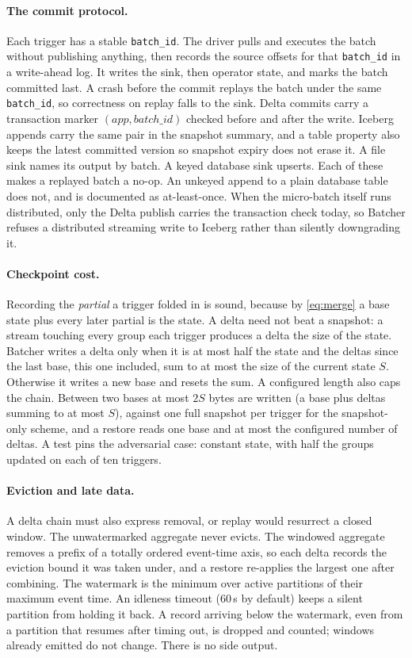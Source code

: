 \documentclass[10pt,twocolumn,letterpaper]{article}   %
\newcommand{\sys}{Batcher}
\begin{document}
\paragraph{The commit protocol.} Each trigger has a stable \texttt{batch\_id}. The driver
pulls and executes the batch without publishing anything, then records the source offsets for
that \texttt{batch\_id} in a write-ahead log. It writes the sink, then operator state, and
marks the batch committed last. A crash before the commit replays the batch under the same
\texttt{batch\_id}, so correctness on replay falls to the sink. Delta commits carry a
transaction marker $(\mathit{app},\mathit{batch\_id})$ checked before and after the write. Iceberg appends carry
the same pair in the snapshot summary, and a table property also keeps the latest committed
version so snapshot expiry does not erase it. A file sink names its output by batch. A keyed
database sink upserts. Each of these makes a replayed batch a no-op. An unkeyed append to a
plain database table does not, and is documented as at-least-once. When the micro-batch itself
runs distributed, only the Delta publish carries the transaction check today, so \sys{}
refuses a distributed streaming write to Iceberg rather than silently downgrading it.

\paragraph{Checkpoint cost.} Recording the \emph{partial} a trigger folded in is sound,
because by \cref{eq:merge} a base state plus every later partial is the state. A delta need
not beat a snapshot: a stream touching every group each trigger produces a delta the size of
the state. \sys{} writes a delta only when it is at most half the state and the deltas since the
last base, this one included, sum to at most the size of the current state $S$. Otherwise it writes a new base and resets the
sum. A configured length also caps the chain. Between two bases at most $2S$ bytes are written
(a base plus deltas summing to at most $S$), against one full snapshot per trigger for the
snapshot-only scheme, and a restore reads one base and at most the configured number of
deltas. A test pins the adversarial case: constant state, with half the groups updated on each
of ten triggers.

\paragraph{Eviction and late data.} A delta chain must also express removal, or replay would
resurrect a closed window. The unwatermarked aggregate never evicts. The windowed aggregate
removes a prefix of a totally ordered event-time axis, so each delta records the eviction bound
it was taken under, and a restore re-applies the largest one after combining. The watermark is
the minimum over active partitions of their maximum event time. An idleness timeout (60\,s by
default) keeps a silent partition from holding it back. A record arriving below the watermark,
even from a partition that resumes after timing out, is dropped and counted; windows already
emitted do not change. There is no side output.
\end{document}

